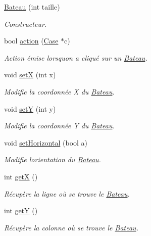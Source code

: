 \begin{DoxyCompactItemize}
\item 
\hyperlink{class_bateau_af9484dd811f8f678d92bfd70e2f1c5e2}{Bateau} (int taille)
\begin{DoxyCompactList}\small\item\em Constructeur. \end{DoxyCompactList}\item 
bool \hyperlink{class_bateau_a3e54040953962f545b5fabadbcc330e8}{action} (\hyperlink{class_case}{Case} $\ast$c)
\begin{DoxyCompactList}\small\item\em Action émise lorsqu\textquotesingle{}on a cliqué sur un \hyperlink{class_bateau}{Bateau}. \end{DoxyCompactList}\item 
void \hyperlink{class_bateau_a12cc2226f5533d98b5b1f71fc042f1a6}{setX} (int x)
\begin{DoxyCompactList}\small\item\em Modifie la coordonnée X du \hyperlink{class_bateau}{Bateau}. \end{DoxyCompactList}\item 
void \hyperlink{class_bateau_ad84a941f5968a3690b80b12ca56547c4}{setY} (int y)
\begin{DoxyCompactList}\small\item\em Modifie la coordonnée Y du \hyperlink{class_bateau}{Bateau}. \end{DoxyCompactList}\item 
void \hyperlink{class_bateau_a1dae1dbd3d3e0334a4dc5b43ef579c25}{set\+Horizontal} (bool a)
\begin{DoxyCompactList}\small\item\em Modifie l\textquotesingle{}orientation du \hyperlink{class_bateau}{Bateau}. \end{DoxyCompactList}\item 
int \hyperlink{class_bateau_ab7bd97ef05abea97c5322a16760b7d51}{getX} ()
\begin{DoxyCompactList}\small\item\em Récupère la ligne où se trouve le \hyperlink{class_bateau}{Bateau}. \end{DoxyCompactList}\item 
int \hyperlink{class_bateau_a178bb83641412590fcc39d8974d6562a}{getY} ()
\begin{DoxyCompactList}\small\item\em Récupère la colonne où se trouve le \hyperlink{class_bateau}{Bateau}. \end{DoxyCompactList}\item 

\end{DoxyCompactItemize}
